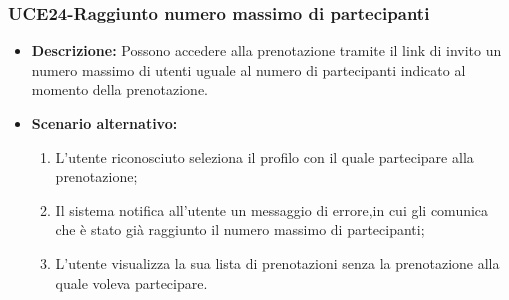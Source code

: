 \subsubsection{UCE24-Raggiunto numero massimo di partecipanti}
\begin{itemize}
    \item \textbf{Descrizione: }Possono accedere alla prenotazione tramite il link di
    invito un numero massimo di utenti uguale al numero di partecipanti indicato al momento della
    prenotazione.
    \item \textbf{Scenario alternativo: }
    \begin{enumerate}
        \item L'utente riconosciuto seleziona il profilo con il quale partecipare alla prenotazione;
        \item Il sistema notifica all'utente un messaggio di errore,in cui gli comunica che è stato
        già raggiunto il numero massimo di partecipanti;
        \item L'utente visualizza la sua lista di prenotazioni senza la prenotazione alla quale voleva
        partecipare.
    \end{enumerate}
\end{itemize}

